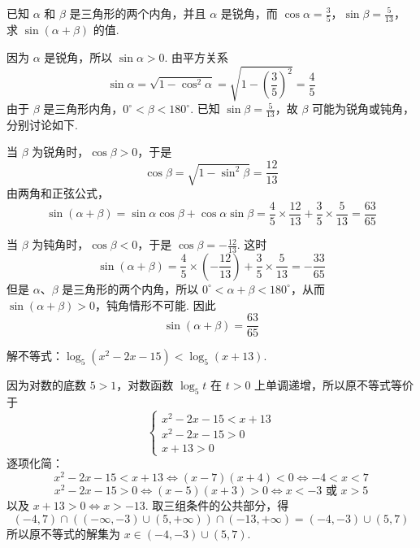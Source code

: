 \begin{problem}
已知 \(\alpha\) 和 \(\beta\) 是三角形的两个内角，并且 \(\alpha\) 是锐角，而 \(\cos\alpha=\frac{3}{5}\)，\(\sin\beta=\frac{5}{13}\)，求 \(\sin\left(\alpha+\beta\right)\) 的值.
\end{problem}

\begin{solution}
因为 \(\alpha\) 是锐角，所以 \(\sin\alpha>0\). 由平方关系
\[
\sin\alpha=\sqrt{1-\cos^2\alpha}=\sqrt{1-\left(\frac{3}{5}\right)^2}=\frac{4}{5}
\]
由于 \(\beta\) 是三角形内角，\(0^\circ<\beta<180^\circ\). 已知 \(\sin\beta=\frac{5}{13}\)，故 \(\beta\) 可能为锐角或钝角，分别讨论如下.

当 \(\beta\) 为锐角时，\(\cos\beta>0\)，于是
\[
\cos\beta=\sqrt{1-\sin^2\beta}=\frac{12}{13}
\]
由两角和正弦公式，
\[
\sin\left(\alpha+\beta\right)=\sin\alpha\cos\beta+\cos\alpha\sin\beta
=\frac{4}{5}\times\frac{12}{13}+\frac{3}{5}\times\frac{5}{13}
=\frac{63}{65}
\]

当 \(\beta\) 为钝角时，\(\cos\beta<0\)，于是 \(\cos\beta=-\frac{12}{13}\). 这时
\[
\sin\left(\alpha+\beta\right)=\frac{4}{5}\times\left(-\frac{12}{13}\right)+\frac{3}{5}\times\frac{5}{13}
=-\frac{33}{65}
\]
但是 \(\alpha\)、\(\beta\) 是三角形的两个内角，所以 \(0^\circ<\alpha+\beta<180^\circ\)，从而 \(\sin\left(\alpha+\beta\right)>0\)，钝角情形不可能. 因此
\[
\sin\left(\alpha+\beta\right)=\frac{63}{65}
\]
\end{solution}

\begin{problem}
解不等式：\(\log_5\left( x^2-2x-15 \right)<\log_5\left( x+13 \right)\).
\end{problem}

\begin{solution}
因为对数的底数 \(5>1\)，对数函数 \(\log_5 t\) 在 \(t>0\) 上单调递增，所以原不等式等价于
\[
\begin{cases}
x^2-2x-15<x+13\\
x^2-2x-15>0\\
x+13>0
\end{cases}
\]
逐项化简：
\[
x^2-2x-15<x+13
\Longleftrightarrow \left(x-7\right)\left(x+4\right)<0
\Longleftrightarrow -4<x<7
\]
\[
x^2-2x-15>0
\Longleftrightarrow \left(x-5\right)\left(x+3\right)>0
\Longleftrightarrow x<-3\text{ 或 }x>5
\]
以及 \(x+13>0\Longleftrightarrow x>-13\). 取三组条件的公共部分，得
\[
\left(-4,7\right)\cap\left(\left(-\infty,-3\right)\cup\left(5,+\infty\right)\right)\cap\left(-13,+\infty\right)
=\left(-4,-3\right)\cup\left(5,7\right)
\]
所以原不等式的解集为 \(x\in\left(-4,-3\right)\cup\left(5,7\right)\).
\end{solution}


